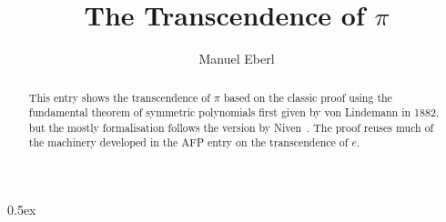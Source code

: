 \documentclass[11pt,a4paper]{article}
\begin{document}
\title{The Transcendence of $\pi$}
\author{Manuel Eberl}
\maketitle

\begin{abstract}
This entry shows the transcendence of $\pi$ based on the classic proof using the fundamental theorem of symmetric polynomials first given by von Lindemann in 1882, but the mostly formalisation follows the version by Niven~\cite{niven_pi39}. The proof reuses much of the machinery developed in the AFP entry on the transcendence of $e$.
\end{abstract}

\tableofcontents
\newpage
\parindent 0pt\parskip 0.5ex





\end{document}
